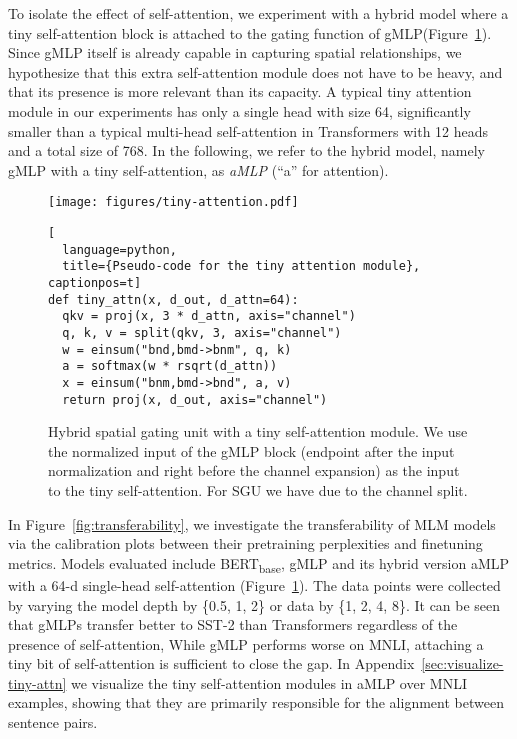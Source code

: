 \documentclass{article}
\newcommand{\gffn}{gMLP\xspace}
\begin{document}
To isolate the effect of self-attention,
we experiment with a hybrid model where a tiny self-attention block is attached to the gating function of \gffn (Figure~\ref{fig:tiny-attn}).
Since \gffn itself is already capable in capturing spatial relationships,
we hypothesize that this extra self-attention module does not have to be heavy, and that its presence is more relevant than its capacity.
A typical tiny attention module in our experiments has only a single head with size 64,
significantly smaller than a typical multi-head self-attention in Transformers with 12 heads and a total size of 768.
In the following,
we refer to the hybrid model, namely gMLP with a tiny self-attention, as \emph{aMLP} (``a'' for attention).

\begin{figure}[h]
    \centering
    \begin{minipage}{0.4\linewidth}
        \texttt{[image: figures/tiny-attention.pdf]}
    \end{minipage}
    \begin{minipage}{0.5\linewidth}
        \begin{lstlisting}[
  language=python,
  title={Pseudo-code for the tiny attention module}, captionpos=t]
def tiny_attn(x, d_out, d_attn=64):
  qkv = proj(x, 3 * d_attn, axis="channel")
  q, k, v = split(qkv, 3, axis="channel")
  w = einsum("bnd,bmd->bnm", q, k)
  a = softmax(w * rsqrt(d_attn))
  x = einsum("bnm,bmd->bnd", a, v)
  return proj(x, d_out, axis="channel")

\end{lstlisting}
    \end{minipage}
    \caption{Hybrid spatial gating unit with a tiny self-attention module. We use the normalized input of the \gffn block (endpoint after the input normalization and right before the channel expansion) as the input to the tiny self-attention. For SGU we have  due to the channel split.}
    \label{fig:tiny-attn}
\end{figure}

In Figure~\ref{fig:transferability}, we investigate the transferability of MLM models via the calibration plots between their pretraining perplexities and finetuning metrics.
Models evaluated include BERT\textsubscript{base},
\gffn and its hybrid version aMLP with a 64-d single-head self-attention (Figure~\ref{fig:tiny-attn}).
The data points were collected by varying the model depth by \{0.5, 1, 2\} or data by \{1, 2, 4, 8\}.
It can be seen that \gffn{s} transfer better to SST-2 than Transformers regardless of the presence of self-attention,
While \gffn performs worse on MNLI, attaching a tiny bit of self-attention is sufficient to close the gap.
In Appendix~\ref{sec:visualize-tiny-attn} we visualize the tiny self-attention modules in aMLP over MNLI examples,
showing that they are primarily responsible for the alignment between sentence pairs.
\end{document}
